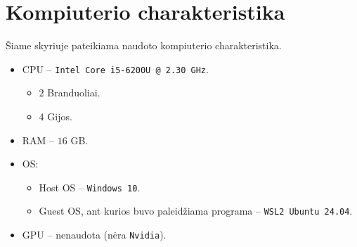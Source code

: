 \section{Kompiuterio charakteristika}
\label{sec:kompiuterio_charakteristika}

Šiame skyriuje pateikiama naudoto kompiuterio charakteristika.

\begin{itemize}
    \item CPU – \texttt{Intel Core i5-6200U @ 2.30 GHz}.
        \begin{itemize}
            \item $2$ Branduoliai.
            \item $4$ Gijos.
        \end{itemize}
    \item RAM – $16$ GB.
    \item OS:
        \begin{itemize}
            \item Host OS – \texttt{Windows 10}.
            \item Guest OS, ant kurios buvo paleidžiama programa – \texttt{WSL2 Ubuntu 24.04}.
        \end{itemize}
    \item GPU – nenaudota (nėra \texttt{Nvidia}).
\end{itemize}